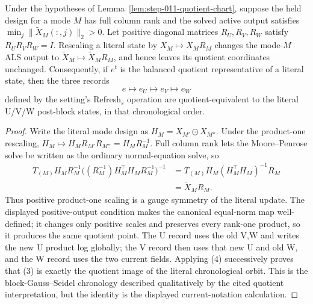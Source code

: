\begin{proposition}\label{prop:step-011-refresh-equivariance}
Under the hypotheses of
Lemma~\ref{lem:step-011-quotient-chart}, suppose the held design for a mode
\(M\) has full column rank and the solved active output satisfies
\(\min_j\|\widetilde X_M(:,j)\|_2>0\). Let positive diagonal matrices
\(R_U,R_V,R_W\) satisfy \(R_UR_VR_W=I\). Rescaling a literal state by
\(X_M\mapsto X_MR_M\) changes the mode-\(M\) ALS output to
\(\widetilde X_M\mapsto\widetilde X_MR_M\), and hence leaves its quotient
coordinates unchanged. Consequently, if \(e^t\) is the balanced quotient
representative of a literal state, then the three records
\[
 e\longmapsto e_U\longmapsto e_V\longmapsto e_W
 \tag{3}
\]
defined by the setting's Refresh$_s$ operation are quotient-equivalent to
the literal U/V/W post-block states, in that chronological order.

\begin{proof}
Write the literal mode design as
\(H_M=X_{M'}\odot X_{M''}\). Under the product-one rescaling,
\(H_M\mapsto H_MR_{M'}R_{M''}=H_MR_M^{-1}\). Full column rank lets the
Moore--Penrose solve be written as the ordinary normal-equation solve, so
\[
\begin{aligned}
T_{(M)}H_MR_M^{-1}
 \big((R_M^{-1})H_M^\top H_MR_M^{-1}\big)^{-1}
 &=T_{(M)}H_M(H_M^\top H_M)^{-1}R_M\\
 &=\widetilde X_MR_M.
\end{aligned}
\tag{4}
\]
Thus positive product-one scaling is a gauge symmetry of the literal update.
The displayed positive-output condition makes the canonical equal-norm map
well-defined; it changes only positive scales and preserves every rank-one
product, so it produces the same quotient point. The U record uses
the old V,W and writes the new U product log globally; the V record then uses
that new U and old W, and the W record uses the two current fields. Applying
(4) successively proves that (3) is exactly the quotient image of the
literal chronological orbit. This is the block-Gauss--Seidel chronology
described qualitatively by the cited quotient interpretation, but the identity is
the displayed current-notation calculation.


\end{proof}
\end{proposition}
